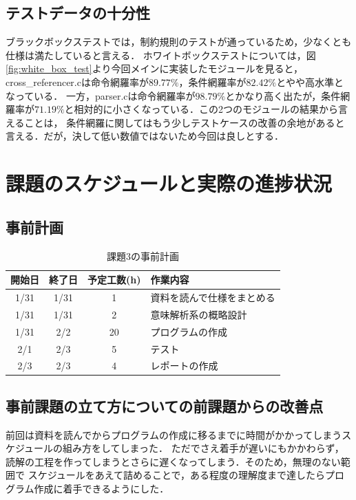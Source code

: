 \documentclass{jlreq}
\begin{document}
\subsection{テストデータの十分性}
ブラックボックステストでは，制約規則のテストが通っているため，少なくとも仕様は満たしていると言える．
ホワイトボックステストについては，図\ref{fig:white_box_test}より今回メインに実装したモジュールを見ると，cross\_referencer.cは命令網羅率が$89.77\%$，条件網羅率が$82.42\%$とやや高水準となっている．
一方，parser.cは命令網羅率が$98.79\%$とかなり高く出たが，条件網羅率が$71.19\%$と相対的に小さくなっている．この2つのモジュールの結果から言えることは，
条件網羅に関してはもう少しテストケースの改善の余地があると言える．だが，決して低い数値ではないため今回は良しとする．

\section{課題のスケジュールと実際の進捗状況}
\subsection{事前計画}
\begin{table}[H]
  \centering
  \caption{課題3の事前計画}
  \begin{tabular}{cccp{10cm}}
    \hline
    開始日 & 終了日 & 予定工数(h) & 作業内容                   \\ \hline
    1/31   & 1/31   & 1           & 資料を読んで仕様をまとめる \\
    1/31   & 1/31   & 2           & 意味解析系の概略設計       \\
    1/31   & 2/2    & 20          & プログラムの作成           \\
    2/1    & 2/3    & 5           & テスト                     \\
    2/3    & 2/3    & 4           & レポートの作成             \\\hline
  \end{tabular}
\end{table}

\subsection{事前課題の立て方についての前課題からの改善点}
前回は資料を読んでからプログラムの作成に移るまでに時間がかかってしまうスケジュールの組み方をしてしまった．
ただでさえ着手が遅いにもかかわらず，読解の工程を作ってしまうとさらに遅くなってしまう．そのため，無理のない範囲で
スケジュールをあえて詰めることで，ある程度の理解度まで達したらプログラム作成に着手できるようにした．
\end{document}
